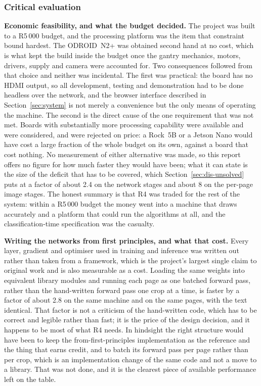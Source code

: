     \subsubsection{Critical evaluation}
    \label{sec:dis-crit}

        \textbf{Economic feasibility, and what the budget decided.}
        The project was built to a \mbox{R5\,000} budget, and the processing platform was the item that constraint bound hardest.
        The ODROID~N2+ was obtained second hand at no cost, which is what kept the build inside the budget once the gantry mechanics, motors, drivers, supply and camera were accounted for.
        Two consequences followed from that choice and neither was incidental.
        The first was practical: the board has no HDMI output, so all development, testing and demonstration had to be done headless over the network, and the browser interface described in Section~\ref{sec:system} is not merely a convenience but the only means of operating the machine.
        The second is the direct cause of the one requirement that was not met.
        Boards with substantially more processing capability were available and were considered, and were rejected on price: a Rock~5B or a Jetson Nano would have cost a large fraction of the whole budget on its own, against a board that cost nothing.
        No measurement of either alternative was made, so this report offers no figure for how much faster they would have been; what it can state is the size of the deficit that has to be covered, which Section~\ref{sec:dis-unsolved} puts at a factor of about 2.4 on the network stages and about 8 on the per-page image stages.
        The honest summary is that R4 was traded for the rest of the system: within a \mbox{R5\,000} budget the money went into a machine that draws accurately and a platform that could run the algorithms at all, and the classification-time specification was the casualty.

        \textbf{Writing the networks from first principles, and what that cost.}
        Every layer, gradient and optimiser used in training and inference was written out rather than taken from a framework, which is the project's largest single claim to original work and is also measurable as a cost.
        Loading the same weights into equivalent library modules and running each page as one batched forward pass, rather than the hand-written forward pass one crop at a time, is faster by a factor of about 2.8 on the same machine and on the same pages, with the text identical.
        That factor is not a criticism of the hand-written code, which has to be correct and legible rather than fast; it is the price of the design decision, and it happens to be most of what R4 needs.
        In hindsight the right structure would have been to keep the from-first-principles implementation as the reference and the thing that earns credit, and to batch its forward pass per page rather than per crop, which is an implementation change of the same code and not a move to a library.
        That was not done, and it is the clearest piece of available performance left on the table.

